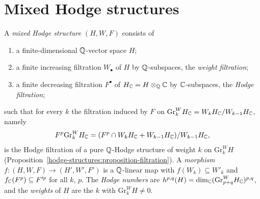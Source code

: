 \section{Mixed Hodge structures}\label{mixed-hodge-structures:section-definition}

\begin{definition}\label{mixed-hodge-structures:definition-mhs}
A \emph{mixed Hodge structure} $(H, W, F)$ consists of
\begin{enumerate}
\item a finite-dimensional $\mathbb{Q}$-vector space $H$;
\item a finite increasing filtration $W_\bullet$ of $H$ by $\mathbb{Q}$-subspaces, the \emph{weight filtration};
\item a finite decreasing filtration $F^\bullet$ of $H_{\mathbb{C}} = H \otimes_{\mathbb{Q}} \mathbb{C}$ by $\mathbb{C}$-subspaces, the \emph{Hodge filtration};
\end{enumerate}
such that for every $k$ the filtration induced by $F$ on $\mathrm{Gr}^W_kH_{\mathbb{C}} = W_kH_{\mathbb{C}}/W_{k-1}H_{\mathbb{C}}$, namely
\[
F^p\mathrm{Gr}^W_kH_{\mathbb{C}} = (F^p \cap W_kH_{\mathbb{C}} + W_{k-1}H_{\mathbb{C}})/W_{k-1}H_{\mathbb{C}},
\]
is the Hodge filtration of a pure $\mathbb{Q}$-Hodge structure of weight $k$ on $\mathrm{Gr}^W_kH$ (Proposition~\ref{hodge-structures:proposition-filtration}). A \emph{morphism}
$f \colon (H, W, F) \to (H', W', F')$ is a $\mathbb{Q}$-linear map with $f(W_k) \subseteq W'_k$ and $f_{\mathbb{C}}(F^p) \subseteq F'^p$ for all $k$, $p$. The \emph{Hodge numbers} are
$h^{p,q}(H) = \dim_{\mathbb{C}}(\mathrm{Gr}^W_{p+q}H_{\mathbb{C}})^{p,q}$, and the \emph{weights} of $H$ are the $k$ with $\mathrm{Gr}^W_kH \neq 0$.
\end{definition}

